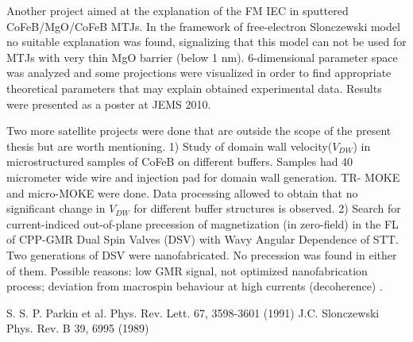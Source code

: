 Another project aimed at the explanation of the FM IEC in sputtered CoFeB/MgO/CoFeB MTJs. In the framework of free-electron Slonczewski model \cite{Slo89} no suitable explanation was found, signalizing that this model can not be used for MTJs with very thin MgO barrier (below 1 nm). 6-dimensional parameter space was analyzed and some projections were visualized in order to find appropriate theoretical parameters that may explain obtained experimental data.
Results were presented as a poster at JEMS 2010.

Two more satellite projects were done that are outside the scope of the present thesis but are worth mentioning.
1)	Study of domain wall velocity($V_{DW}$) in microstructured samples of CoFeB on different buffers. 
Samples had 40 micrometer wide wire and injection pad for domain wall generation.
TR- MOKE and micro-MOKE were done. Data processing allowed to obtain that no significant change in $V_{DW}$ for different buffer structures is observed. 
2)	Search for current-indiced out-of-plane precession of magnetization (in zero-field) in the FL of CPP-GMR Dual Spin Valves (DSV) with Wavy Angular Dependence of STT.
Two generations of DSV were nanofabricated. No precession was found in either of them. Possible reasons: low GMR signal, not optimized nanofabrication process; deviation from macrospin behaviour at high currents (decoherence) \cite{Par91,Slo89}.



\begin{thebibliography}{Aok99}

 S. S. P. Parkin et al. Phys. Rev. Lett. 67, 3598-3601 (1991)
 J.C. Slonczewski Phys. Rev. B 39, 6995 (1989)
\end{thebibliography}